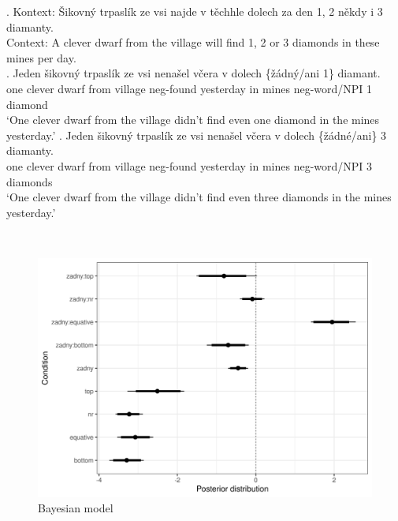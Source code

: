 \documentclass[
  ignorenonframetext,
]{beamer}
\begin{document}
\begin{frame}
\ex. Kontext: Šikovný trpaslík ze vsi najde v těchhle dolech za den 1, 2
někdy i 3 diamanty.\\
Context: A clever dwarf from the village will find 1, 2 or 3 diamonds in
these mines per day.\\
\ag. Jeden šikovný trpaslík ze vsi nenašel včera v dolech \{žádný/ani
1\} diamant.\\
one clever dwarf from village neg-found yesterday in mines neg-word/NPI
1 diamond\\
`One clever dwarf from the village didn't find even one diamond in the
mines yesterday.' \bg. Jeden šikovný trpaslík ze vsi nenašel včera v
dolech \{žádné/ani\} 3 diamanty.\\
one clever dwarf from village neg-found yesterday in mines neg-word/NPI
3 diamonds\\
`One clever dwarf from the village didn't find even three diamonds in
the mines yesterday.'

~
\end{frame}

\begin{frame}
\begin{figure}
\centering
\includegraphics{"acc-results-complex.png"}
\caption{Bayesian model}
\end{figure}
\end{frame}
\end{document}
